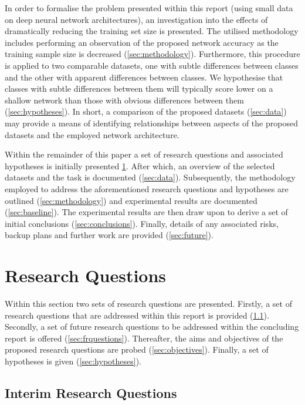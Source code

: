 \documentclass{article}
\begin{document}
In order to formalise the problem presented within this report (using small data on deep neural network architectures), an investigation into the effects of dramatically reducing the training set size is presented. The utilised methodology includes performing an observation of the proposed network accuracy as the training sample size is decreased (\ref{sec:methodology}). Furthermore, this procedure is applied to two comparable datasets, one with subtle differences between classes and the other with apparent differences between classes. We hypothesise that classes with subtle differences between them will typically score lower on a shallow network than those with obvious differences between them (\ref{sec:hypotheses}). In short, a comparison of the proposed datasets (\ref{sec:data}) may provide a means of identifying relationships between aspects of the proposed datasets and the employed network architecture.

Within the remainder of this paper a set of research questions and associated hypotheses is initially presented \ref{sec:questions}. After which, an overview of the selected datasets and the task is documented (\ref{sec:data}). Subsequently, the methodology employed to address the aforementioned research questions and hypotheses are outlined (\ref{sec:methodology}) and experimental results are documented (\ref{sec:baseline}). The experimental results are then draw upon to derive a set of initial conclusions (\ref{sec:conclusions}). Finally, details of any associated risks, backup plans and further work are provided (\ref{sec:future}).

\section{Research Questions}
\label{sec:questions}

Within this section two sets of research questions are presented. Firstly, a set of research questions that are addressed within this report is provided (\ref{sec:irquestions}). Secondly, a set of future research questions to be addressed within the concluding report is offered (\ref{sec:frquestions}). Thereafter, the aims and objectives of the proposed research questions are probed (\ref{sec:objectives}). Finally, a set of hypotheses is given (\ref{sec:hypotheses}).

\subsection{Interim Research Questions}
\label{sec:irquestions}
\end{document}
